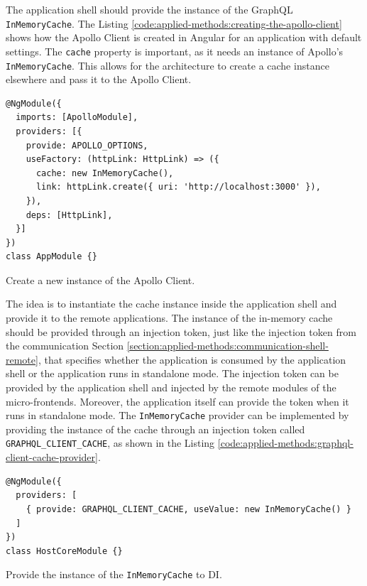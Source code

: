 \noindent The application shell should provide the instance of the GraphQL \texttt{InMemoryCache}. The Listing \ref{code:applied-methods:creating-the-apollo-client} shows how the Apollo Client is created in Angular for an application with default settings. The \texttt{cache} property is important, as it needs an instance of Apollo's \texttt{InMemoryCache}. This allows for the architecture to create a cache instance elsewhere and pass it to the Apollo Client. 

\ifshowListings
\begin{listing}[H]
\begin{verbatim}
@NgModule({
  imports: [ApolloModule],
  providers: [{
    provide: APOLLO_OPTIONS,
    useFactory: (httpLink: HttpLink) => ({
      cache: new InMemoryCache(),
      link: httpLink.create({ uri: 'http://localhost:3000' }),
    }),
    deps: [HttpLink],
  }]
})
class AppModule {}
\end{verbatim}
\caption{Create a new instance of the Apollo Client.}\label{code:applied-methods:creating-the-apollo-client}
\end{listing}
\fi

\noindent The idea is to instantiate the cache instance inside the application shell and provide it to the remote applications. The instance of the in-memory cache should be provided through an injection token, just like the injection token from the communication Section \ref{section:applied-methods:communication-shell-remote}, that specifies whether the application is consumed by the application shell or the application runs in standalone mode. The injection token can be provided by the application shell and injected by the remote modules of the micro-frontends. Moreover, the application itself can provide the token when it runs in standalone mode. The \texttt{InMemoryCache} provider can be implemented by providing the instance of the cache through an injection token called \texttt{GRAPHQL\_CLIENT\_CACHE}, as shown in the Listing \ref{code:applied-methods:graphql-client-cache-provider}.

\ifshowListings
\begin{listing}[H]
\begin{verbatim}
@NgModule({
  providers: [
    { provide: GRAPHQL_CLIENT_CACHE, useValue: new InMemoryCache() }
  ]
})
class HostCoreModule {}
\end{verbatim}
\caption{Provide the instance of the \texttt{InMemoryCache} to \ac{DI}.}\label{code:applied-methods:graphql-client-cache-provider}
\end{listing}
\fi


